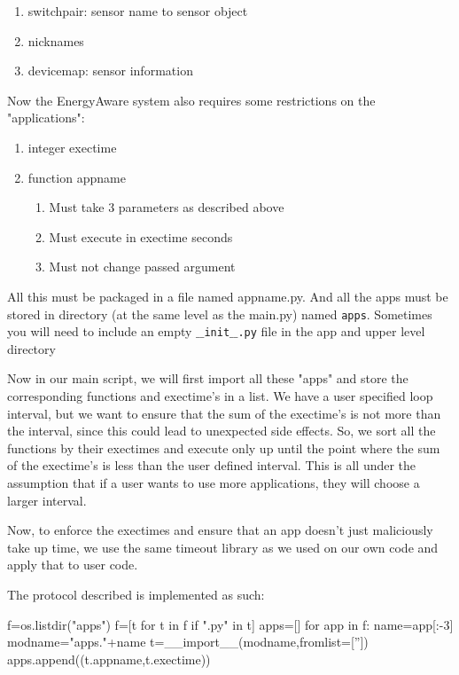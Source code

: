 \documentclass{sig-alternate-05-2015}
\begin{document}
\begin{enumerate}
	\item switchpair: sensor name to sensor object
	\item nicknames
	\item devicemap: sensor information
\end{enumerate}

Now the EnergyAware system also requires some restrictions on the "applications":
\begin{enumerate}
	\item integer exectime
	\item function appname
	\begin{enumerate}
		\item Must take 3 parameters as described above
		\item Must execute in exectime seconds
		\item Must not change passed argument
	\end{enumerate}
\end{enumerate}

All this must be packaged in a file named appname.py. And all the apps must be stored in directory (at the same level as the main.py) named \texttt{apps}. Sometimes you will need to include an empty \texttt{$\_\_$init$\_\_$.py} file in the app and upper level directory

Now in our main script, we will first import all these "apps" and store the corresponding functions and exectime's in a list. We have a user specified loop interval, but we want to ensure that the sum of the exectime's is not more than the interval, since this could lead to unexpected side effects. So, we sort all the functions by their exectimes and execute only up until the point where the sum of the exectime's is less than the user defined interval. This is all under the assumption that if a user wants to use more applications, they will choose a larger interval.

Now, to enforce the exectimes and ensure that an app doesn't just maliciously take up time, we use the same timeout library as we used on our own code and apply that to user code.

The protocol described is implemented as such:
\begin{python}
f=os.listdir("apps")
f=[t for t in f if ".py" in t]
apps=[]
for app in f:
	name=app[:-3]
	modname="apps."+name
	t=__import__(modname,fromlist=['']) 
	apps.append((t.appname,t.exectime))
\end{python}
\end{document}
